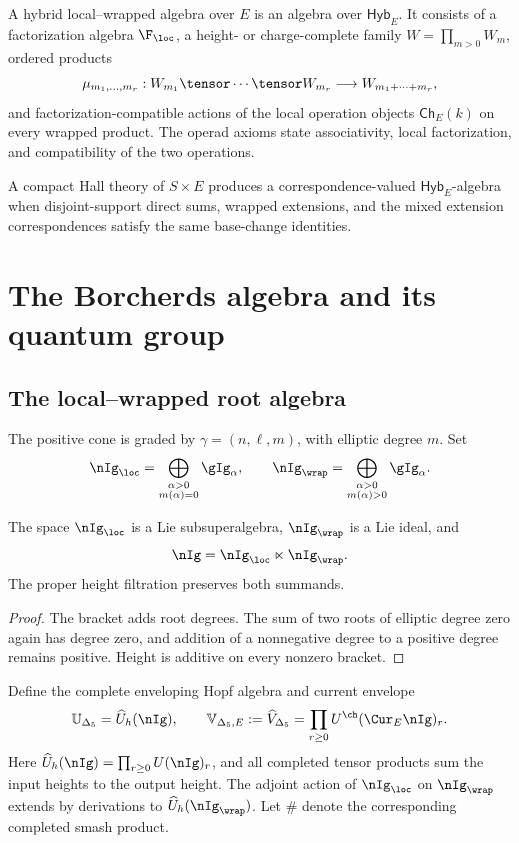 \begin{definition}
A hybrid local--wrapped algebra over $E$ is an algebra over $\mathsf{Hyb}_E$. It consists of a factorization algebra $\F_{\loc}$, a height- or charge-complete family $W=\prod_{m>0}W_m$, ordered products
\[
 \mu_{m_1,\ldots,m_r}:W_{m_1}\tensor\cdots\tensor W_{m_r}
 \longrightarrow W_{m_1+\cdots+m_r},
\]
and factorization-compatible actions of the local operation objects $\mathsf{Ch}_E(k)$ on every wrapped product. The operad axioms state associativity, local factorization, and compatibility of the two operations.
\end{definition}

A compact Hall theory of $S\times E$ produces a correspondence-valued $\mathsf{Hyb}_E$-algebra when disjoint-support direct sums, wrapped extensions, and the mixed extension correspondences satisfy the same base-change identities.


\part{The Borcherds algebra and its quantum group}

\chapter{The local--wrapped root algebra}
The positive cone is graded by $\gamma=(n,\ell,m)$, with elliptic degree $m$.  Set
\[
 \nIg_{\loc}=\bigoplus_{\substack{\alpha>0\\m(\alpha)=0}}\gIg_\alpha,
 \qquad
 \nIg_{\wrap}=\bigoplus_{\substack{\alpha>0\\m(\alpha)>0}}\gIg_\alpha.
\]

\begin{proposition}
The space $\nIg_{\loc}$ is a Lie subsuperalgebra, $\nIg_{\wrap}$ is a Lie ideal, and
\[
 \nIg=\nIg_{\loc}\ltimes\nIg_{\wrap}.
\]
The proper height filtration preserves both summands.
\end{proposition}
\begin{proof}
The bracket adds root degrees.  The sum of two roots of elliptic degree zero again has degree zero, and addition of a nonnegative degree to a positive degree remains positive.  Height is additive on every nonzero bracket.
\end{proof}

Define the complete enveloping Hopf algebra and current envelope
\[
 \mathbb U_{\Delta_5}=\widehat U_h(\nIg),
 \qquad
 \mathbb V_{\Delta_5,E}:=\widehat V_{\Delta_5}
       =\prod_{r\ge0}U^{\ch}(\Cur_E\nIg)_r.
\]
Here $\widehat U_h(\nIg)=\prod_{r\ge0}U(\nIg)_r$,
and all completed tensor products sum the input heights
to the output height.
The adjoint action of $\nIg_{\loc}$ on $\nIg_{\wrap}$ extends by derivations to $\widehat U_h(\nIg_{\wrap})$.  Let $\# $ denote the corresponding completed smash product.

